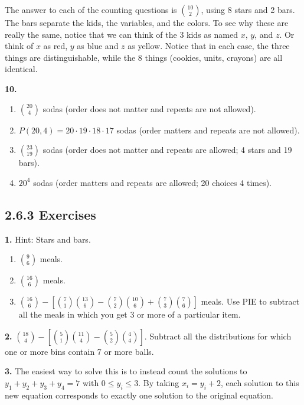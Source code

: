 \documentclass[10pt,]{book}
\theoremstyle{plain}
\theoremstyle{definition}
\theoremstyle{definition}
\theoremstyle{definition}
\numberwithin{equation}{chapter}
\begin{document}
The answer to each of the counting questions is \({10 \choose 2}\), using 8 stars and 2 bars. The bars separate the kids, the variables, and the colors. To see why these are really the same, notice that we can think of the 3 kids as named \(x\), \(y\), and \(z\). Or think of \(x\) as red, \(y\) as blue and \(z\) as yellow. Notice that in each case, the three things are distinguishable, while the 8 things (cookies, units, crayons) are all identical.
%
\par\smallskip
\noindent\textbf{10.}\quad{}\leavevmode%
\begin{enumerate}[label=(\alph*)]
\item\hypertarget{li-605}{}\({20 \choose 4}\) sodas (order does not matter and repeats are not allowed).%
\item\hypertarget{li-606}{}\(P(20, 4) = 20\cdot 19\cdot 18 \cdot 17\) sodas (order matters and repeats are not allowed).%
\item\hypertarget{li-607}{}\({23 \choose 19}\) sodas (order does not matter and repeats are allowed; 4 stars and 19 bars).%
\item\hypertarget{li-608}{}\(20^4\) sodas (order matters and repeats are allowed; 20 choices 4 times).%
\end{enumerate}
\par\smallskip
\subsection*{2.6.3 Exercises}
\noindent\textbf{1.}\quad{}
            Hint: Stars and bars.
\leavevmode%
\begin{enumerate}[label=(\alph*)]
\item\hypertarget{li-642}{}\({9 \choose 6}\) meals.%
\item\hypertarget{li-643}{}\({16 \choose 6}\) meals.%
\item\hypertarget{li-644}{}\({16 \choose 6} - \left[{7 \choose 1}{13 \choose 6} - {7 \choose 2}{10 \choose 6} + {7 \choose 3}{7 \choose 6}\right]\) meals.  Use PIE to subtract all the meals in which you get 3 or more of a particular item.%
\end{enumerate}
\par\smallskip
\noindent\textbf{2.}\quad{}
            \({18 \choose 4} - \left[ {5 \choose 1}{11 \choose 4} - {5 \choose 2}{4 \choose 4}\right]\). Subtract all the distributions for which one or more bins contain 7 or more balls.
\par\smallskip
\noindent\textbf{3.}\quad{}
            The easiest way to solve this is to instead count the solutions to \(y_1 + y_2 + y_3 + y_4 = 7\) with \(0 \le y_i \le 3\). By taking \(x_i = y_i+2\), each solution to this new equation corresponds to exactly one solution to the original equation.
\par
\end{document}
